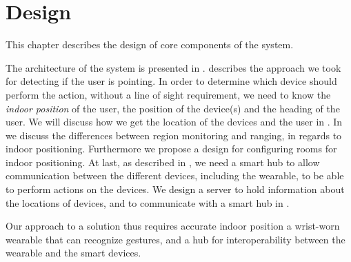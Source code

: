 \chapter{Design}\label{chap:design}

This chapter describes the design of core components of the system.

The architecture of the system is presented in .
 describes the approach we took for detecting if the user is pointing.
In order to determine which device should perform the action, 
without a line of sight requirement, 
we need to know the \emph{indoor position} of the user, 
the position of the device(s) and the heading of the user. 
We will discuss how we get the location of the devices and the user in .
In  we discuss the differences between region monitoring and ranging, 
in regards to indoor positioning. 
Furthermore we propose a design for configuring rooms for indoor positioning.
At last, as described in , 
we need a smart hub to allow communication between the different devices, 
including the wearable, to be able to perform actions on the devices. 
We design a server to hold information about the locations of devices,
and to communicate with a smart hub in . 

Our approach to a solution thus requires accurate indoor position 
a wrist-worn wearable that can recognize gestures, 
and a hub for interoperability between the wearable and the smart devices. 








